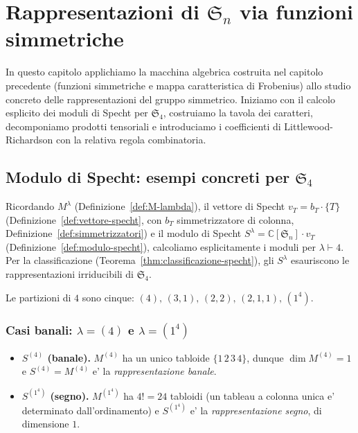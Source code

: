 % 
\chapter{Rappresentazioni di $ \mathfrak{S}_n $ via funzioni simmetriche}

In questo capitolo applichiamo la macchina algebrica costruita nel capitolo precedente
(funzioni simmetriche e mappa caratteristica di Frobenius) allo studio concreto delle
rappresentazioni del gruppo simmetrico. Iniziamo con il calcolo esplicito dei moduli di
Specht per $ \mathfrak{S}_4 $, costruiamo la tavola dei caratteri, decomponiamo prodotti
tensoriali e introduciamo i coefficienti di Littlewood-Richardson con la relativa regola
combinatoria.

\section{Modulo di Specht: esempi concreti per $ \mathfrak{S}_4 $}

Ricordando $ M^\lambda $ (Definizione~\ref{def:M-lambda}), il vettore di Specht $ v_T = b_T \cdot \{T\} $
(Definizione~\ref{def:vettore-specht}, con $ b_T $ simmetrizzatore di colonna,
Definizione~\ref{def:simmetrizzatori}) e il modulo di Specht
$ S^\lambda = \mathbb{C}[\mathfrak{S}_n] \cdot v_T $ (Definizione~\ref{def:modulo-specht}),
calcoliamo esplicitamente i moduli per $ \lambda \vdash 4 $. Per la classificazione
(Teorema~\ref{thm:classificazione-specht}), gli $ S^\lambda $ esauriscono le rappresentazioni
irriducibili di $ \mathfrak{S}_4 $.

Le partizioni di $ 4 $ sono cinque: $ (4),\, (3,1),\, (2,2),\, (2,1,1),\, (1^4) $.

\subsection{Casi banali: $ \lambda = (4) $ e $ \lambda = (1^4) $}

\begin{itemize}
  \item \textbf{$ S^{(4)} $ (banale).} $ M^{(4)} $ ha un unico tabloide $ \{1\,2\,3\,4\} $,
  dunque $ \dim M^{(4)} = 1 $ e $ S^{(4)} = M^{(4)} $ e' la \textit{rappresentazione banale}.
  \item \textbf{$ S^{(1^4)} $ (segno).} $ M^{(1^4)} $ ha $ 4! = 24 $ tabloidi (un tableau a
  colonna unica e' determinato dall'ordinamento) e $ S^{(1^4)} $ e' la \textit{rappresentazione
  segno}, di dimensione $ 1 $.
\end{itemize}

